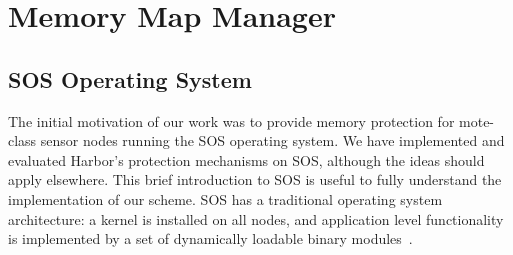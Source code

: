 \section{Memory Map Manager}
\label{sec:memmap}
%
\subsection{SOS Operating System}
\label{sec:background}
% 
The initial motivation of our work was to provide memory protection
for mote-class sensor nodes running the SOS operating system.
% 
% 
We have implemented and evaluated Harbor's protection mechanisms on
SOS, although the ideas should apply elsewhere.
% 
This brief introduction to SOS is useful to fully understand the
implementation of our scheme.
% 
% 
% 
% 
% 
% 
SOS has a traditional operating system architecture: a kernel is
installed on all nodes, and
% 
application level functionality is implemented by a set of dynamically
loadable binary modules~\cite{ram05sos}.
% 
% 
% 
% 
